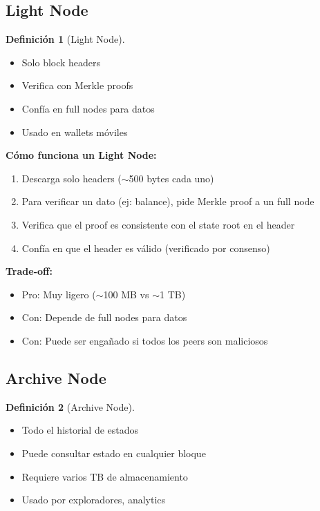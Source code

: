\documentclass[11pt,a4paper,twoside,openright]{book}
\theoremstyle{definition}
\newtheorem{definition}{Definición}[chapter]
\theoremstyle{plain}
\theoremstyle{remark}
\begin{document}
\subsection{Light Node}

\begin{definition}[Light Node]
\begin{itemize}
    \item Solo block headers
    \item Verifica con Merkle proofs
    \item Confía en full nodes para datos
    \item Usado en wallets móviles
\end{itemize}
\end{definition}

\begin{keyidea}
\textbf{Cómo funciona un Light Node:}

\begin{enumerate}
    \item Descarga solo headers ($\sim$500 bytes cada uno)
    \item Para verificar un dato (ej: balance), pide Merkle proof a un full node
    \item Verifica que el proof es consistente con el state root en el header
    \item Confía en que el header es válido (verificado por consenso)
\end{enumerate}

\textbf{Trade-off:}
\begin{itemize}
    \item Pro: Muy ligero ($\sim$100 MB vs $\sim$1 TB)
    \item Con: Depende de full nodes para datos
    \item Con: Puede ser engañado si todos los peers son maliciosos
\end{itemize}
\end{keyidea}

\subsection{Archive Node}

\begin{definition}[Archive Node]
\begin{itemize}
    \item Todo el historial de estados
    \item Puede consultar estado en cualquier bloque
    \item Requiere varios TB de almacenamiento
    \item Usado por exploradores, analytics
\end{itemize}
\end{definition}
\end{document}

